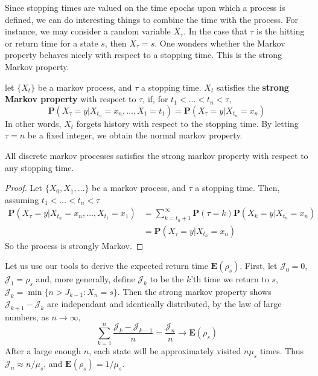 Since stopping times are valued on the time epochs upon which a process is defined, we can do interesting things to combine the time with the process. For instance, we may consider a random variable $X_{\tau}$. In the case that $\tau$ is the hitting or return time for a state $s$, then $X_{\tau} = s$. One wonders whether the Markov property behaves nicely with respect to a stopping time. This is the strong Markov property.

\begin{definition}
    let $\{ X_t \}$ be a markov process, and $\tau$ a stopping time. $X_t$ satisfies the {\bf strong Markov property} with respect to $\tau$, if, for $t_1 < \dots < t_n < \tau$,
    \[ \mathbf{P}(X_\tau = y | X_{t_n} = x_n, \dots, X_1 = t_1) = \mathbf{P}(X_\tau = y | X_{t_n} = x_n) \]
    In other words, $X_t$ forgets history with respect to the stopping time. By letting $\tau = n$ be a fixed integer, we obtain the normal markov property.
\end{definition}

\begin{theorem}
    All discrete markov processes satisfies the strong markov property with respect to any stopping time.
\end{theorem}
\begin{proof}
    Let $\{ X_0, X_1, \dots \}$ be a markov process, and $\tau$ a stopping time. Then, assuming $t_1 < \dots < t_n < \tau$
    \begin{align*}
        \mathbf{P}(X_\tau = y | X_{t_n} = x_n, \dots, X_{t_1} = x_1) &= \sum_{k = t_n + 1}^\infty \mathbf{P}(\tau = k) \mathbf{P}(X_k = y | X_{t_n} = x_n)\\
        &= \mathbf{P}(X_\tau = y | X_{t_n} = x_n)
    \end{align*}
    So the process is strongly Markov.
\end{proof}

Let us use our tools to derive the expected return time $\mathbf{E}(\rho_s)$. First, let $\mathcal{J}_0 = 0$, $\mathcal{J}_1 = \rho_s$ and, more generally, define $\mathcal{J}_k$ to be the $k$'th time we return to $s$, $\mathcal{J}_k = \min \{ n > J_{k-1} : X_n = s \}$. Then the strong markov property shows $\mathcal{J}_{k+1} - \mathcal{J}_k$ are independant and identically distributed, by the law of large numbers, as $n \to \infty$,
%
\[ \sum_{k = 1}^n \frac{\mathcal{J}_k - \mathcal{J}_{k-1}}{n} = \frac{\mathcal{J}_n}{n} \to \mathbf{E}(\rho_s) \]
%
After a large enough $n$, each state will be approximately visited $n \mu_s$ times. Thus $\mathcal{J}_n \approx n/\mu_s$, and $\mathbf{E}(\rho_s) = 1/\mu_s$.


